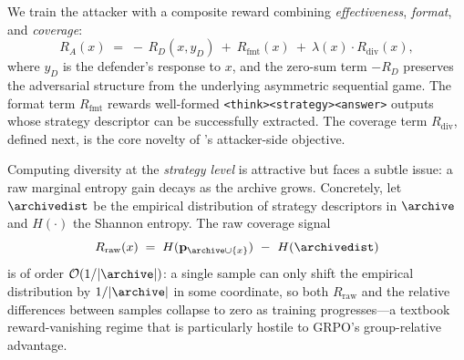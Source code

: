 We train the attacker with a composite reward combining \emph{effectiveness}, \emph{format}, and \emph{coverage}:
\begin{equation}
  R_A(x) \;=\; -\,R_D(x, y_D)\ +\ R_{\mathrm{fmt}}(x)\ +\ \lambda(x)\cdot R_{\mathrm{div}}(x),
  \label{eq:reward-A}
\end{equation}
where $y_D$ is the defender's response to $x$, and the zero-sum term $-R_D$ preserves the adversarial structure from the underlying asymmetric sequential game. The format term $R_{\mathrm{fmt}}$ rewards well-formed \texttt{<think><strategy><answer>} outputs whose strategy descriptor can be successfully extracted. The coverage term $R_{\mathrm{div}}$, defined next, is the core novelty of \method's attacker-side objective.

Computing diversity at the \emph{strategy level} is attractive but faces a subtle issue: a raw marginal entropy gain decays as the archive grows. Concretely, let $\archivedist$ be the empirical distribution of strategy descriptors in $\archive$ and $H(\cdot)$ the Shannon entropy. The raw coverage signal
\begin{equation}
  R_{\mathrm{raw}}(x) \;=\; H(\mathbf{p}_{\archive\cup\{x\}})\ -\ H(\archivedist)
\end{equation}
is of order $\mathcal{O}(1/|\archive|)$: a single sample can only shift the empirical distribution by $1/|\archive|$ in some coordinate, so both $R_{\mathrm{raw}}$ and the relative differences between samples collapse to zero as training progresses---a textbook reward-vanishing regime that is particularly hostile to GRPO's group-relative advantage.


